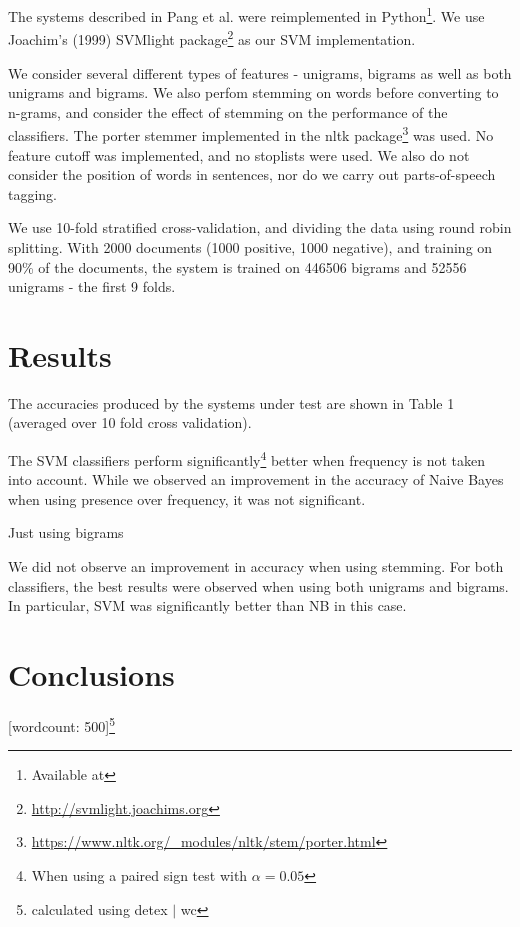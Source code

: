 \documentclass[12pt,a4paper]{article}
\begin{document}
\begin{multicols}{2}
The systems described in Pang et al. were reimplemented in Python\footnote{Available at }. We use Joachim's (1999) SVMlight package\footnote{\url{http://svmlight.joachims.org}} as our SVM implementation.

We consider several different types of features - unigrams, bigrams as well as both unigrams and bigrams. We also perfom stemming on words before converting to n-grams, and consider the effect of stemming on the performance of the classifiers. The porter stemmer implemented in the nltk package\footnote{\url{https://www.nltk.org/_modules/nltk/stem/porter.html}} was used. No feature cutoff was implemented, and no stoplists were used. We also do not consider the position of words in sentences, nor do we carry out parts-of-speech tagging.

We use 10-fold stratified cross-validation, and dividing the data using round robin splitting. With 2000 documents (1000 positive, 1000 negative), and training on 90\% of the documents, the system is trained on 446506 bigrams and 52556 unigrams - the first 9 folds.

\section{Results}

The accuracies produced by the systems under test are shown in Table 1 (averaged over 10 fold cross validation).

The SVM classifiers perform significantly\footnote{When using a paired sign test with $\alpha = 0.05$} better when frequency is not taken into account. While we observed an improvement in the accuracy of Naive Bayes when using presence over frequency, it was not significant.

Just using bigrams

We did not observe an improvement in accuracy when using stemming. For both classifiers, the best results were observed when using both unigrams and bigrams. In particular, SVM was significantly better than NB in this case.

\section{Conclusions}

\centerline{[wordcount: 500]\footnote{calculated using detex $|$ wc}}

\end{multicols}

\clearpage


\end{document}
